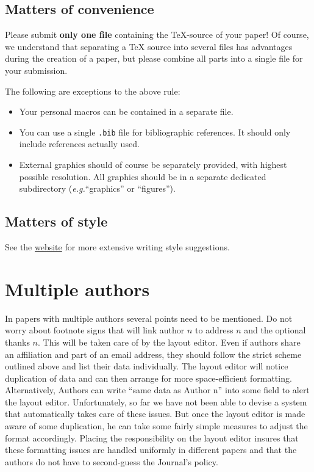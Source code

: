 \documentclass{jpc} %
\theoremstyle{plain}\newtheorem{satz}[thm]{Satz} %
\def\eg{{\em e.g.}}
\begin{document}
\subsection*{Matters of convenience}

  Please submit {\bf only one file} containing the
  TeX-source of your paper!   Of course,
  we understand that separating a TeX source into several files has
  advantages during the creation of a paper, but please combine all
  parts into a single file for your submission.

  The following are exceptions to the above rule:
  \begin{itemize}
  	\item Your personal macros can  be contained in a separate file.
  	\item You can use a single \texttt{.bib} file for bibliographic references. It should only include references actually used.
  	\item External
  graphics should of course be separately provided, with highest possible resolution. All graphics should be in a separate dedicated subdirectory (\eg ``graphics'' or ``figures'').
\end{itemize}

\subsection*{Matters of style}

  See the \href{https://journalprivacyconfidentiality.org/index.php/jpc/about/submissions}{website} for more extensive writing style suggestions.

\section{Multiple authors}

  In papers with multiple authors several points need to be mentioned.
  Do not worry about footnote signs that will link author $n$ to
  address $n$ and the optional thanks $n$.  This will be taken care of
  by the layout editor.  Even if authors share an affiliation and part
  of an email address, they should follow the strict scheme outlined
  above and list their data individually.  The layout editor will
  notice duplication of data and can then arrange for more
  space-efficient formatting.  Alternatively, Authors can write ``same
  data as Author n'' into some field to alert the layout editor.
  Unfortunately, so far we have not been able to devise a system that
  automatically takes care of these issues.  But once the layout
  editor is made aware of some duplication, he can take some fairly
  simple measures to adjust the format accordingly.  Placing the
  responsibility on the layout editor insures that these formatting
  issues are handled uniformly in different papers and that the
  authors do not have to second-guess the Journal's policy.
\end{document}
